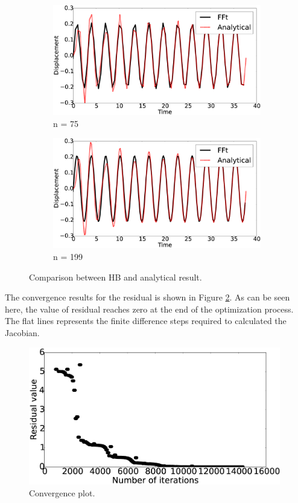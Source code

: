\documentclass[12pt, a4paper]{extarticle}
\begin{document}
\begin{figure}[H]
	\centering
	\begin{subfigure}[h]{8.0 cm}
		\includegraphics[width=8.0 cm]{figure/2N75.eps}
		\caption{n = 75}
	\end{subfigure}
	\begin{subfigure}[h]{8.0 cm}
        \includegraphics[width=8.0 cm]{figure/2N199.eps}
		\caption{n = 199}
    \end{subfigure}
    \caption{Comparison between HB and analytical result.}
    \label{fig:R2}
\end{figure}

The convergence results for the residual is shown in Figure \ref{fig:R2_convergence}. As can be seen here, the value of residual reaches zero at the end of the optimization process. The flat lines represents the finite difference steps required to calculated the Jacobian.

\begin{figure}[h]
	\centering
	\includegraphics[height=6.00cm]{figure/convergence_study_32.eps}
	\caption{Convergence plot.}
	\label{fig:R2_convergence}
\end{figure}
\end{document}
